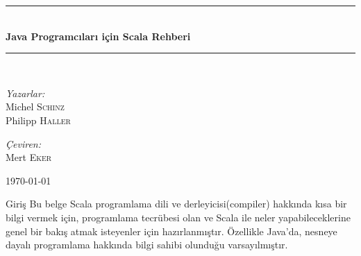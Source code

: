 \documentclass[10pt,a4paper]{book}
\newcommand{\HRule}{\rule{\linewidth}{0.5mm}}
\begin{document}
\begin{titlepage}
\begin{center}
\HRule \\[1.5cm]
{ \huge \bfseries Java Programcıları için Scala Rehberi}\\[1.5cm]
\HRule \\[1.5cm]

\begin{minipage}{0.4\textwidth}
\begin{flushleft} \large
\emph{Yazarlar:}\\
Michel \textsc{Schinz}\\
Philipp \textsc{Haller}
\end{flushleft}
\end{minipage}
\begin{minipage}{0.4\textwidth}
\begin{flushright} \large
\emph{Çeviren:} \\
Mert \textsc{Eker}\\

\end{flushright}
\end{minipage}
\vfill
{\large \today}

\end{center}
\end{titlepage}
\tableofcontents

\begin{chapter}{Giriş}
Bu belge Scala programlama dili ve derleyicisi(compiler) hakkında kısa bir bilgi vermek için, programlama tecrübesi olan ve Scala ile neler yapabileceklerine genel bir bakış atmak isteyenler için hazırlanmıştır. Özellikle Java'da, nesneye dayalı programlama hakkında bilgi sahibi olunduğu varsayılmıştır.
\end{chapter}
\end{document}
